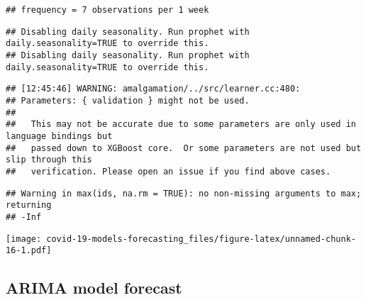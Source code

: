 \documentclass[
]{article}
\newenvironment{Shaded}{\begin{snugshade}}{\end{snugshade}}
\newcommand{\CommentTok}[1]{\textcolor[rgb]{0.56,0.35,0.01}{\textit{#1}}}
\newcommand{\DataTypeTok}[1]{\textcolor[rgb]{0.13,0.29,0.53}{#1}}
\newcommand{\DecValTok}[1]{\textcolor[rgb]{0.00,0.00,0.81}{#1}}
\newcommand{\KeywordTok}[1]{\textcolor[rgb]{0.13,0.29,0.53}{\textbf{#1}}}
\newcommand{\NormalTok}[1]{#1}
\newcommand{\OperatorTok}[1]{\textcolor[rgb]{0.81,0.36,0.00}{\textbf{#1}}}
\newcommand{\OtherTok}[1]{\textcolor[rgb]{0.56,0.35,0.01}{#1}}
\newcommand{\StringTok}[1]{\textcolor[rgb]{0.31,0.60,0.02}{#1}}
\begin{document}
\begin{Shaded}
\end{Shaded}

\begin{verbatim}
## frequency = 7 observations per 1 week
\end{verbatim}

\begin{verbatim}
## Disabling daily seasonality. Run prophet with daily.seasonality=TRUE to override this.
## Disabling daily seasonality. Run prophet with daily.seasonality=TRUE to override this.
\end{verbatim}

\begin{verbatim}
## [12:45:46] WARNING: amalgamation/../src/learner.cc:480: 
## Parameters: { validation } might not be used.
## 
##   This may not be accurate due to some parameters are only used in language bindings but
##   passed down to XGBoost core.  Or some parameters are not used but slip through this
##   verification. Please open an issue if you find above cases.
\end{verbatim}

\begin{verbatim}
## Warning in max(ids, na.rm = TRUE): no non-missing arguments to max; returning
## -Inf
\end{verbatim}

\texttt{[image: covid-19-models-forecasting\_files/figure-latex/unnamed-chunk-16-1.pdf]}

\hypertarget{arima-model-forecast}{%
\subsection{ARIMA model forecast}\label{arima-model-forecast}}
\end{document}
